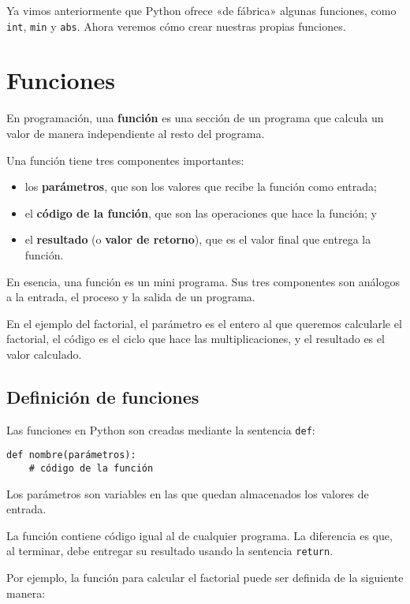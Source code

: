 Ya vimos anteriormente que Python ofrece «de fábrica» algunas funciones,
como \lstinline!int!, \lstinline!min! y \lstinline!abs!. Ahora veremos
cómo crear nuestras propias funciones.

\section{Funciones}

En programación, una \textbf{función} es una sección de un programa que
calcula un valor de manera independiente al resto del programa.

Una función tiene tres componentes importantes:

\begin{itemize}
\item
  los \textbf{parámetros}, que son los valores que recibe la función
  como entrada;
\item
  el \textbf{código de la función}, que son las operaciones que hace la
  función; y
\item
  el \textbf{resultado} (o \textbf{valor de retorno}), que es el valor
  final que entrega la función.
\end{itemize}

En esencia, una función es un mini programa. Sus tres componentes son
análogos a la entrada, el proceso y la salida de un programa.

En el ejemplo del factorial, el parámetro es el entero al que queremos
calcularle el factorial, el código es el ciclo que hace las
multiplicaciones, y el resultado es el valor calculado.

\subsection{Definición de funciones}

Las funciones en Python son creadas mediante la sentencia
\lstinline!def!:

\begin{lstlisting}
def nombre(parámetros):
    # código de la función
\end{lstlisting}

Los parámetros son variables en las que quedan almacenados los valores
de entrada.

La función contiene código igual al de cualquier programa. La diferencia
es que, al terminar, debe entregar su resultado usando la sentencia
\lstinline!return!.

Por ejemplo, la función para calcular el factorial puede ser definida de
la siguiente manera:

